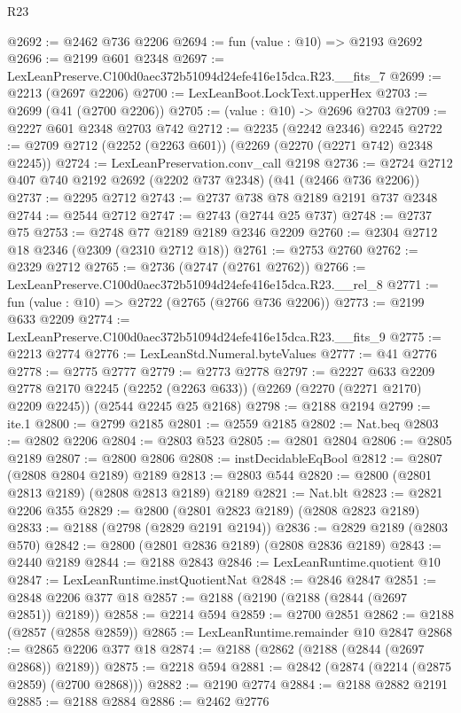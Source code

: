 \begin{lexlean}{R23}
\begin{coremodule}
@2692 := @2462 @736 @2206
@2694 := fun (value : @10) => @2193 @2692
@2696 := @2199 @601 @2348
@2697 := LexLeanPreserve.C100d0aec372b51094d24efe416e15dca.R23.__fits_7
@2699 := @2213 (@2697 @2206)
@2700 := LexLeanBoot.LockText.upperHex
@2703 := @2699 (@41 (@2700 @2206))
@2705 := (value : @10) -> @2696 @2703
@2709 := @2227 @601 @2348 @2703 @742
@2712 := @2235 (@2242 @2346) @2245
@2722 := @2709 @2712 (@2252 (@2263 @601)) (@2269 (@2270 (@2271 @742) @2348 @2245))
@2724 := LexLeanPreservation.conv_call @2198
@2736 := @2724 @2712 @407 @740 @2192 @2692 (@2202 @737 @2348) (@41 (@2466 @736 @2206))
@2737 := @2295 @2712
@2743 := @2737 @738 @78 @2189 @2191 @737 @2348
@2744 := @2544 @2712
@2747 := @2743 (@2744 @25 @737)
@2748 := @2737 @75
@2753 := @2748 @77 @2189 @2189 @2346 @2209
@2760 := @2304 @2712 @18 @2346 (@2309 (@2310 @2712 @18))
@2761 := @2753 @2760
@2762 := @2329 @2712
@2765 := @2736 (@2747 (@2761 @2762))
@2766 := LexLeanPreserve.C100d0aec372b51094d24efe416e15dca.R23.__rel_8
@2771 := fun (value : @10) => @2722 (@2765 (@2766 @736 @2206))
@2773 := @2199 @633 @2209
@2774 := LexLeanPreserve.C100d0aec372b51094d24efe416e15dca.R23.__fits_9
@2775 := @2213 @2774
@2776 := LexLeanStd.Numeral.byteValues
@2777 := @41 @2776
@2778 := @2775 @2777
@2779 := @2773 @2778
@2797 := @2227
    @633
    @2209
    @2778
    @2170
    @2245
    (@2252 (@2263 @633))
    (@2269 (@2270 (@2271 @2170) @2209 @2245))
    (@2544 @2245 @25 @2168)
@2798 := @2188 @2194
@2799 := ite.{1}
@2800 := @2799 @2185
@2801 := @2559 @2185
@2802 := Nat.beq
@2803 := @2802 @2206
@2804 := @2803 @523
@2805 := @2801 @2804
@2806 := @2805 @2189
@2807 := @2800 @2806
@2808 := instDecidableEqBool
@2812 := @2807 (@2808 @2804 @2189) @2189
@2813 := @2803 @544
@2820 := @2800 (@2801 @2813 @2189) (@2808 @2813 @2189) @2189
@2821 := Nat.blt
@2823 := @2821 @2206 @355
@2829 := @2800 (@2801 @2823 @2189) (@2808 @2823 @2189)
@2833 := @2188 (@2798 (@2829 @2191 @2194))
@2836 := @2829 @2189 (@2803 @570)
@2842 := @2800 (@2801 @2836 @2189) (@2808 @2836 @2189)
@2843 := @2440 @2189
@2844 := @2188 @2843
@2846 := LexLeanRuntime.quotient @10
@2847 := LexLeanRuntime.instQuotientNat
@2848 := @2846 @2847
@2851 := @2848 @2206 @377 @18
@2857 := @2188 (@2190 (@2188 (@2844 (@2697 @2851)) @2189))
@2858 := @2214 @594
@2859 := @2700 @2851
@2862 := @2188 (@2857 (@2858 @2859))
@2865 := LexLeanRuntime.remainder @10 @2847
@2868 := @2865 @2206 @377 @18
@2874 := @2188 (@2862 (@2188 (@2844 (@2697 @2868)) @2189))
@2875 := @2218 @594
@2881 := @2842 (@2874 (@2214 (@2875 @2859) (@2700 @2868)))
@2882 := @2190 @2774
@2884 := @2188 @2882 @2191
@2885 := @2188 @2884
@2886 := @2462 @2776

\end{coremodule}
\end{lexlean}

